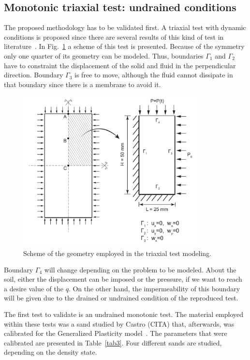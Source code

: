 \documentclass[preprint,12pt,a4paper]{elsarticle}
\begin{document}
\subsection{Monotonic triaxial test: undrained conditions}
\label{sec:31}
The proposed methodology has to be validated first. A triaxial test with dynamic conditions is proposed since there are several results of this kind of test in literature~\cite{PastorZC:90,Zienkiewicz99}. In Fig.~\ref{fig_Geo} a scheme of this test is presented. Because of the symmetry only one quarter of its geometry can be modeled. Thus, boundaries $\Gamma_1$ and $\Gamma_2$ have to constraint the displacement of the solid and fluid in the perpendicular direction. Boundary $\Gamma_3$ is free to move, although the fluid cannot dissipate in that boundary since there is a membrane to avoid it.

\begin{figure}
\centering
\includegraphics[width=0.85\textwidth]{Figs/Geo.pdf}
\caption{Scheme of the geometry employed in the triaxial test modeling.}
\label{fig_Geo}
\end{figure}

Boundary $\Gamma_4$ will change depending on the problem to be modeled. About the soil, either the displacement can be imposed or the pressure, if we want to reach a desire value of the $q$. On the other hand, the impermeability of this boundary will be given due to the drained or undrained condition of the reproduced test.

The first test to validate is an undrained monotonic test. The material employed within these tests was a sand studied by Castro (CITA) that, afterwards, was calibrated for the Generalized Plasticity model~\cite{PastorZC:90,Zienkiewicz99}. The parameters that were calibrated are presented in Table~\ref{tab3}. Four different sands are studied, depending on the density state.
\end{document}
